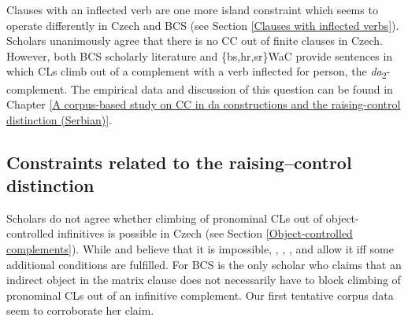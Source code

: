 Clauses with an inflected verb are one more island constraint which seems to operate differently in Czech and BCS (see Section \ref{Clauses with inflected verbs}). Scholars unanimously agree that there is no CC out of finite clauses in Czech. However, both BCS scholarly literature and \{bs,hr,sr\}WaC provide sentences in which CLs climb out of a complement with a verb inflected for person, the \textit{da}\textsubscript{2}-complement. The empirical data and discussion of this question can be found in Chapter \ref{A corpus-based study on CC in da constructions and the raising-control distinction (Serbian)}. 

\subsection{Constraints related to the raising--control distinction}


Scholars do not agree whether climbing of pronominal CLs out of ob\-ject-con\-trolled infinitives is possible in Czech (see Section \ref{Object-controlled complements}). While \citet{Thorpe91} and \citet{Junghanns02} believe that it is impossible, \citet{LelandToman76}, \citet{Dotlacil04}, \citet{Rezac05}, and \citet{Hana07} allow it iff some additional conditions are fulfilled. For BCS \citet{Aljovic05} is the only scholar who claims that an indirect object in the matrix clause does not necessarily have to block climbing of pronominal CLs out of an infinitive complement. Our first tentative corpus data seem to corroborate her claim. 


